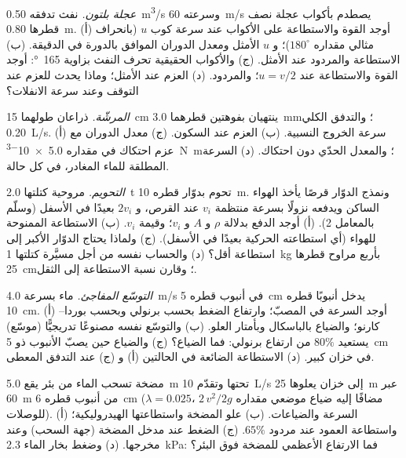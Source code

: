\begin{exercise}[$\star\star$]\label{exo:b2:flow-balances:5}
\emph{عجلة بلتون.} نفث تدفقه \qty{0.50}{m^3/s} وسرعته \qty{60}{m/s} يصطدم
بأكواب عجلة نصف قطرها \qty{0.80}{m}. (أ) أوجد القوة والاستطاعة على
الأكواب عند سرعة كوب $u$ (بانحراف مثالي مقداره $180^\circ$)؛ و $u$ الأمثل
ومعدل الدوران الموافق بالدورة في الدقيقة. (ب) الاستطاعة والمردود
عند الأمثل. (ج) والأكواب الحقيقية تحرف النفث بزاوية \qty{165}{\degree}:
أوجد القوة والاستطاعة عند $u = v/2$؛ والمردود. (د) العزم عند الأمثل؛
وماذا يحدث للعزم عند التوقف وعند سرعة الانفلات؟
\end{exercise}

\begin{exercise}[$\star\star$]\label{exo:b2:flow-balances:6}
\emph{المرشّة.} ذراعان طولهما \qty{15}{cm} ينتهيان بفوهتين قطرهما \qty{3.0}{mm}؛
والتدفق الكلي \qty{0.20}{L/s}. (أ) سرعة الخروج النسبية. (ب) العزم عند
السكون. (ج) معدل الدوران مع عزم احتكاك في  مقداره
\qty{5.0e-3}{N.m}؛ والمعدل الحدّي دون احتكاك. (د) السرعة المطلقة
للماء المغادر، في كل حالة.
\end{exercise}

\begin{exercise}[$\star\star$]\label{exo:b2:flow-balances:7}
\emph{التحويم.} مروحية كتلتها \qty{2.0}{t} تحوم بدوّار قطره
\qty{10}{m}. ونمذج الدوّار قرصًا يأخذ الهواء الساكن
ويدفعه نزولًا بسرعة منتظمة $v_i$ عند القرص، و $2v_i$ بعيدًا
في الأسفل (وسلّم بالمعامل 2). (أ) أوجد الدفع بدلالة $\rho$ و $A$ و $v_i$؛
وقيمة $v_i$. (ب) الاستطاعة الممنوحة للهواء (أي استطاعته الحركية بعيدًا
في الأسفل). (ج) ولماذا يحتاج الدوّار الأكبر إلى استطاعة أقل؟ (د) والحساب
نفسه من أجل مسيَّرة كتلتها \qty{1}{kg} بأربع مراوح قطرها \qty{25}{cm}؛
وقارن نسبة الاستطاعة إلى الثقل.
\end{exercise}

\begin{exercise}[$\star\star$]\label{exo:b2:flow-balances:8}
\emph{التوسّع المفاجئ.} ماء بسرعة \qty{4.0}{m/s} في أنبوب قطره \qty{5}{cm} يدخل
أنبوبًا قطره \qty{10}{cm}. (أ) أوجد السرعة في المصبّ؛ وارتفاع الضغط بحسب
برنولي وبحسب بوردا--كارنو؛ والضياع بالباسكال وبأمتار
العلو. (ب) والتوسّع نفسه مصنوعًا تدريجيًّا (موسّع) يستعيد $80\%$
من ارتفاع برنولي: فما الضياع؟ (ج) والضياع حين يصبّ الأنبوب ذو \qty{5}{cm}
في خزان كبير. (د) الاستطاعة الضائعة في الحالتين (أ) و (ج) عند التدفق المعطى.
\end{exercise}

\begin{exercise}[$\star\star$]\label{exo:b2:flow-balances:9}
مضخة تسحب الماء من بئر يقع \qty{5.0}{m} تحتها وتقدّم
\qty{10}{L/s} إلى خزان يعلوها \qty{25}{m} عبر \qty{60}{m} من أنبوب قطره \qty{6}{cm}
($\lambda = 0.025$، مضافًا إليه ضياع موضعي مقداره $2\,v^2/2g$ للوصلات).
(أ) السرعة والضياعات. (ب) علو المضخة واستطاعتها الهيدروليكية؛ واستطاعة
العمود عند مردود $65\%$. (ج) الضغط عند مدخل المضخة (جهة السحب) وعند
مخرجها. (د) وضغط بخار الماء \qty{2.3}{kPa}: فما الارتفاع الأعظمي
للمضخة فوق البئر؟
\end{exercise}

